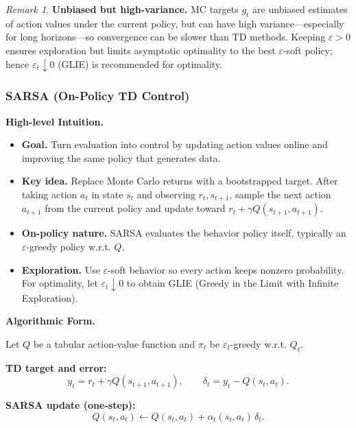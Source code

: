 \documentclass[
]{book}
\providecommand{\tightlist}{%
  \setlength{\itemsep}{0pt}\setlength{\parskip}{0pt}}
\theoremstyle{definition}
\theoremstyle{definition}
\theoremstyle{definition}
\theoremstyle{definition}
\theoremstyle{remark}
\newtheorem*{remark}{Remark}
\begin{document}
\begin{remark}
\textbf{Unbiased but high-variance.} MC targets \(g_t\) are unbiased estimates of action values under the current policy, but can have high variance---especially for long horizons---so convergence can be slower than TD methods. Keeping \(\varepsilon>0\) ensures exploration but limits asymptotic optimality to the best \(\varepsilon\)-soft policy; hence \(\varepsilon_t \downarrow 0\) (GLIE) is recommended for optimality.
\end{remark}

\subsubsection{SARSA (On-Policy TD Control)}\label{sarsa-on-policy-td-control}

\textbf{High-level Intuition.}

\begin{itemize}
\tightlist
\item
  \textbf{Goal.} Turn evaluation into control by updating action values online and improving the same policy that generates data.
\item
  \textbf{Key idea.} Replace Monte Carlo returns with a bootstrapped target. After taking action \(a_t\) in state \(s_t\) and observing \(r_{t}, s_{t+1}\), sample the next action \(a_{t+1}\) from the current policy and update toward \(r_{t} + \gamma Q(s_{t+1}, a_{t+1})\).
\item
  \textbf{On-policy nature.} SARSA evaluates the behavior policy itself, typically an \(\varepsilon\)-greedy policy w.r.t. \(Q\).
\item
  \textbf{Exploration.} Use \(\varepsilon\)-soft behavior so every action keeps nonzero probability. For optimality, let \(\varepsilon_t \downarrow 0\) to obtain GLIE (Greedy in the Limit with Infinite Exploration).
\end{itemize}

\textbf{Algorithmic Form.}

Let \(Q\) be a tabular action-value function and \(\pi_t\) be \(\varepsilon_t\)-greedy w.r.t. \(Q_t\).

\textbf{TD target and error:}
\begin{equation}
y_t = r_{t} + \gamma Q(s_{t+1}, a_{t+1}), \qquad
\delta_t = y_t - Q(s_t, a_t).
\label{eq:SARSA-TDTarget}
\end{equation}

\textbf{SARSA update (one-step):}
\begin{equation}
Q(s_t, a_t) \leftarrow Q(s_t, a_t) + \alpha_t(s_t,a_t)\, \delta_t.
\label{eq:SARSA-QUpdate}
\end{equation}
\end{document}
